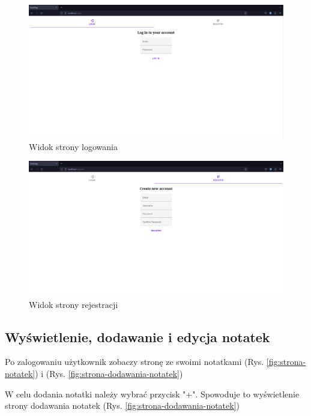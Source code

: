 \documentclass[a4paper,twoside,12pt]{book}
\begin{document}
\begin{figure}[H]
\centering
\includegraphics[width=1.0\textwidth]{./images/strona-logowania.png}
\caption{Widok strony logowania}
\label{fig:strona-logowania}
\end{figure}

\begin{figure}[H]
\centering
\includegraphics[width=1.0\textwidth]{./images/strona-rejestracji.png}
\caption{Widok strony rejestracji}
\label{fig:strona-rejestracji}
\end{figure}

\subsection{Wyświetlenie, dodawanie i edycja notatek}

Po zalogowaniu użytkownik zobaczy stronę ze swoimi notatkami
(Rys. \ref{fig:strona-notatek}) i (Rys. \ref{fig:strona-dodawania-notatek})

W celu dodania notatki należy wybrać przycisk "+". 
Spowoduje to wyświetlenie strony dodawania notatek (Rys. \ref{fig:strona-dodawania-notatek})
\end{document}
